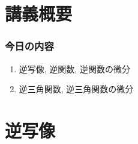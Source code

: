 
\section{講義概要}


\begin{frame}
\frametitle{今日の内容}



\begin{enumerate}
\item 逆写像, 逆関数, 逆関数の微分
\item 逆三角関数, 逆三角関数の微分
\end{enumerate} 



\end{frame}









\section{逆写像}


